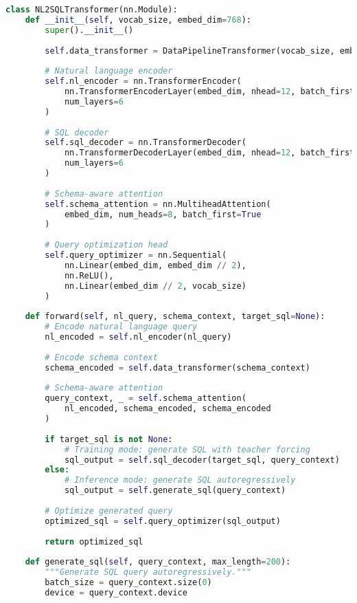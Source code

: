 \begin{lstlisting}[language=Python, caption=Natural language to SQL generation system]
class NL2SQLTransformer(nn.Module):
    def __init__(self, vocab_size, embed_dim=768):
        super().__init__()
        
        self.data_transformer = DataPipelineTransformer(vocab_size, embed_dim)
        
        # Natural language encoder
        self.nl_encoder = nn.TransformerEncoder(
            nn.TransformerEncoderLayer(embed_dim, nhead=12, batch_first=True),
            num_layers=6
        )
        
        # SQL decoder
        self.sql_decoder = nn.TransformerDecoder(
            nn.TransformerDecoderLayer(embed_dim, nhead=12, batch_first=True),
            num_layers=6
        )
        
        # Schema-aware attention
        self.schema_attention = nn.MultiheadAttention(
            embed_dim, num_heads=8, batch_first=True
        )
        
        # Query optimization head
        self.query_optimizer = nn.Sequential(
            nn.Linear(embed_dim, embed_dim // 2),
            nn.ReLU(),
            nn.Linear(embed_dim // 2, vocab_size)
        )
        
    def forward(self, nl_query, schema_context, target_sql=None):
        # Encode natural language query
        nl_encoded = self.nl_encoder(nl_query)
        
        # Encode schema context
        schema_encoded = self.data_transformer(schema_context)
        
        # Schema-aware attention
        query_context, _ = self.schema_attention(
            nl_encoded, schema_encoded, schema_encoded
        )
        
        if target_sql is not None:
            # Training mode: generate SQL with teacher forcing
            sql_output = self.sql_decoder(target_sql, query_context)
        else:
            # Inference mode: generate SQL autoregressively
            sql_output = self.generate_sql(query_context)
        
        # Optimize generated query
        optimized_sql = self.query_optimizer(sql_output)
        
        return optimized_sql
    
    def generate_sql(self, query_context, max_length=200):
        """Generate SQL query autoregressively."""
        batch_size = query_context.size(0)
        device = query_context.device
        

\end{lstlisting}

